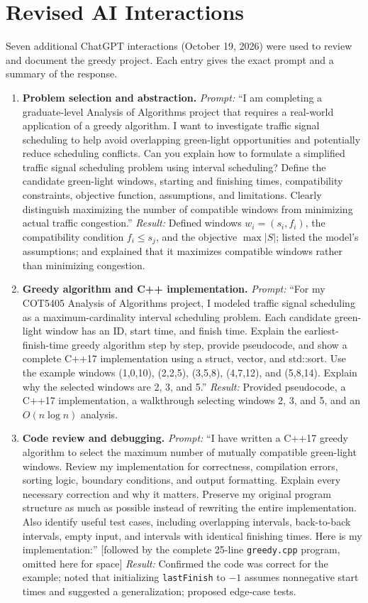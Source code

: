 \section{Revised AI Interactions}

Seven additional ChatGPT interactions (October 19,
2026) were used to review and document the greedy
project. Each entry gives the exact prompt and a
summary of the response.

\begin{enumerate}

\item \textbf{Problem selection and abstraction.}
\emph{Prompt:} ``I am completing a graduate-level
Analysis of Algorithms project that requires a
real-world application of a greedy algorithm. I want
to investigate traffic signal scheduling to help avoid
overlapping green-light opportunities and potentially
reduce scheduling conflicts. Can you explain how to
formulate a simplified traffic signal scheduling
problem using interval scheduling? Define the candidate
green-light windows, starting and finishing times,
compatibility constraints, objective function,
assumptions, and limitations. Clearly distinguish
maximizing the number of compatible windows from
minimizing actual traffic congestion.''
\emph{Result:} Defined windows $w_i=(s_i,f_i)$, the
compatibility condition $f_i \le s_j$, and the
objective $\max|S|$; listed the model's assumptions;
and explained that it maximizes compatible windows
rather than minimizing congestion.

\item \textbf{Greedy algorithm and C++ implementation.}
\emph{Prompt:} ``For my COT5405 Analysis of Algorithms
project, I modeled traffic signal scheduling as a
maximum-cardinality interval scheduling problem. Each
candidate green-light window has an ID, start time, and
finish time. Explain the earliest-finish-time greedy
algorithm step by step, provide pseudocode, and show a
complete C++17 implementation using a struct, vector,
and std::sort. Use the example windows (1,0,10),
(2,2,5), (3,5,8), (4,7,12), and (5,8,14). Explain why
the selected windows are 2, 3, and 5.''
\emph{Result:} Provided pseudocode, a C++17
implementation, a walkthrough selecting windows 2, 3,
and 5, and an $O(n\log n)$ analysis.

\item \textbf{Code review and debugging.}
\emph{Prompt:} ``I have written a C++17 greedy algorithm
to select the maximum number of mutually compatible
green-light windows. Review my implementation for
correctness, compilation errors, sorting logic,
boundary conditions, and output formatting. Explain
every necessary correction and why it matters. Preserve
my original program structure as much as possible
instead of rewriting the entire implementation. Also
identify useful test cases, including overlapping
intervals, back-to-back intervals, empty input, and
intervals with identical finishing times. Here is my
implementation:'' [followed by the complete 25-line
\texttt{greedy.cpp} program, omitted here for space]
\emph{Result:} Confirmed the code was correct for the
example; noted that initializing \texttt{lastFinish} to
$-1$ assumes nonnegative start times and suggested a
generalization; proposed edge-case tests.


\end{enumerate}
